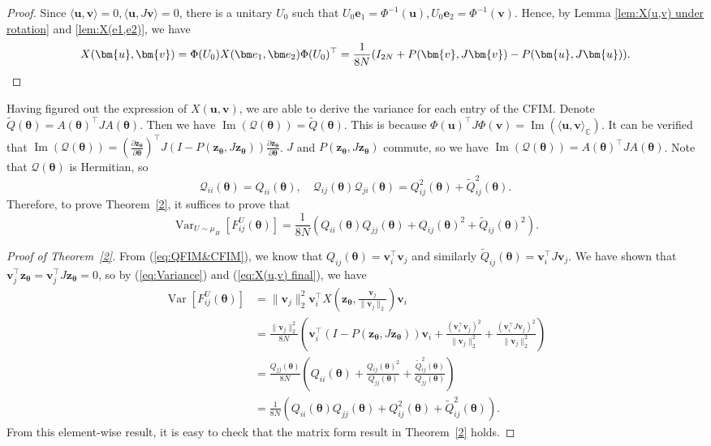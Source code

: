 \documentclass{amsart}
\theoremstyle{plain}
\theoremstyle{definition}
\theoremstyle{remark}
\newcommand{\thmref}[1]{Theorem~\ref{#1}}
\newcommand{\CC}{\mathbb{C}}
\DeclareMathOperator{\var}{Var}
\begin{document}
\begin{proof}
    Since $\langle\bm{u},\bm{v}\rangle=0,\langle\bm{u},J\bm{v}\rangle=0$, there is a unitary $U_0$ such that $U_0\bm e_1=\Phi^{-1}(\bm{u}),U_0\bm e_2=\Phi^{-1}(\bm{v})$. Hence, by Lemma \ref{lem:X(u,v) under rotation} and \ref{lem:X(e1,e2)}, we have 
    \[X(\bm{u},\bm{v})=\Phi(U_0) X(\bm e_1,\bm e_2)\Phi(U_0)^\top=\frac{1}{8N}(I_{2N}+P(\bm{v},J\bm{v})-P(\bm{u},J\bm{u})).
    \qedhere \]
\end{proof}
Having figured out the expression of $X(\bm u,\bm v)$, we are able to derive the variance for each entry of the CFIM. Denote $\tilde Q(\bm\theta)=A(\bm\theta)^\top JA(\bm\theta)$. Then we have $\operatorname{Im}(\mathcal{Q}(\bm\theta))=\tilde Q(\bm\theta)$. This is because $\Phi(\bm{u})^\top J\Phi(\bm{v})=\operatorname{Im}(\langle\bm{u},\bm{v}\rangle_{\CC})$. It can be verified that $\operatorname{Im}(\mathcal{Q}(\bm\theta))=(\frac{\partial\bm{z}_{\bm\theta}}{\partial\bm\theta})^\top J(I-P(\bm{z}_{\bm\theta},J\bm{z}_{\bm\theta}))\frac{\partial\bm{z}_{\bm\theta}}{\partial\bm\theta}$. $J$ and $P(\bm{z}_{\bm\theta},J\bm{z}_{\bm\theta})$ commute, so we have $\operatorname{Im}(\mathcal{Q}(\bm\theta))=A(\bm\theta)^\top JA(\bm\theta)$. Note that $\mathcal{Q}(\bm\theta)$ is Hermitian, so \[\mathcal{Q}_{ii}(\bm\theta)=Q_{ii}(\bm\theta),\quad \mathcal{Q}_{ij}(\bm\theta)\mathcal{Q}_{ji}(\bm\theta)=Q_{ij}^2(\bm\theta)+\tilde Q_{ij}^2(\bm\theta).\] Therefore, to prove \thmref{2}, it suffices to prove that 
\[\var_{U\sim\mu_H}[F_{ij}^U(\bm\theta)]=\frac{1}{8N}(Q_{ii}(\bm\theta)Q_{jj}(\bm\theta)+{Q}_{ij}(\bm\theta)^2+\tilde {Q}_{ij}(\bm\theta)^2).\]
\begin{proof}[Proof of \thmref{2}]
From (\ref{eq:QFIM&CFIM}), we know that $Q_{ij}(\bm\theta)=\bm v_i^\top\bm v_j$ and similarly $\tilde Q_{ij}(\bm\theta)=\bm v_i^\top J\bm v_j$.
We have shown that $\bm v_j^\top\bm{z}_{\bm{\theta}}=\bm v_j^\top J\bm{z}_{\bm{\theta}}=0$, so by (\ref{eq:Variance}) and (\ref{eq:X(u,v) final}), we have 
    \begin{align*}
        \var[F_{ij}^U(\bm{\theta})]&=\|\bm v_j\|_2^2\bm v_i^\top X(\bm{z}_{\bm{\theta}},\frac{\bm v_j}{\|\bm v_j\|_2})\bm v_i\\
        &=\frac{\|\bm v_j\|_2^2}{8N}\left(\bm v_i^\top(I-P(\bm{z}_{\bm{\theta}},J\bm{z}_{\bm{\theta}}))\bm v_i+\frac{(\bm v_i^\top\bm v_j)^2}{\|\bm v_j\|_2^2}+\frac{(\bm v_i^\top J\bm v_j)^2}{\|\bm v_j\|_2^2}\right)\\
        &=\frac{Q_{jj}(\bm{\theta})}{8N}\left(Q_{ii}(\bm{\theta})+\frac{Q_{ij}(\bm{\theta})^2}{Q_{jj}(\bm{\theta})}+\frac{\tilde Q_{ij}^2(\bm{\theta})}{Q_{jj}(\bm{\theta})}\right)\\
        &=\frac{1}{8N}(Q_{ii}(\bm{\theta})Q_{jj}(\bm{\theta})+Q_{ij}^2(\bm{\theta})+\tilde Q_{ij}^2(\bm{\theta})).
    \end{align*}
    From this element-wise result, it is easy to check that the matrix form result in \thmref{2} holds.
\end{proof}
\end{document}
